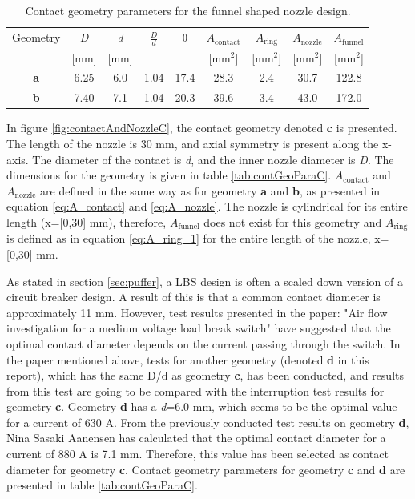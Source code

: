 \documentclass[10pt,b5paper,twoside]{article}
\begin{document}
\begin{table}[H]
\center
\caption{Contact geometry parameters for the funnel shaped nozzle design.}
 \begin{tabular}{|c|c|c|c|c|c|c|c|c|}
\hline 
Geometry & \textit{D} & \textit{d}  & $\frac{D}{d}$ & $\mathrm{\theta}$ & $A_\mathrm{{contact}}$ & $A_\mathrm{{ring}}$  & $A_\mathrm{{nozzle}}$ & $A_\mathrm{{funnel}}$ \\
  & [mm] &  [mm] &   &   &   [mm$^2$] &  [mm$^2$] &   [mm$^2$] &   [mm$^2$]\\
\hline 
\textbf{a} & 6.25 & 6.0 & 1.04 & 17.4 & 28.3 & 2.4 & 30.7 & 122.8\\ 
\hline 
\textbf{b} & 7.40 & 7.1 & 1.04 & 20.3 & 39.6 & 3.4 & 43.0 & 172.0\\ 
\hline 
\end{tabular} 
\label{tab:contGeoPara}
\end{table}

In figure \ref{fig:contactAndNozzleC}, the contact geometry denoted \textbf{c} is presented. The length of the nozzle is 30 mm, and axial symmetry is present along the x-axis. The diameter of the contact is \textit{d}, and the inner nozzle diameter is \textit{D}. The dimensions for the geometry is given in table \ref{tab:contGeoParaC}. $A_\mathrm{{contact}}$ and $A_\mathrm{{nozzle}}$ are defined in the same way as for geometry \textbf{a} and \textbf{b}, as presented in equation \eqref{eq:A_contact} and \eqref{eq:A_nozzle}. The nozzle is cylindrical for its entire length (x=[0,30] mm), therefore, $A_\mathrm{{funnel}}$ does not exist for this geometry and $A_\mathrm{{ring}}$ is defined as in equation \eqref{eq:A_ring_1} for the entire length of the nozzle, x=[0,30] mm. 

As stated in section \ref{sec:puffer}, a LBS design is often a scaled down version of a circuit breaker design. A result of this is that a common contact diameter is approximately 11 mm. However, test results presented in the paper: "Air flow investigation for a medium voltage load break switch" \cite{bib:AFIMVLBA} have suggested that the optimal contact diameter depends on the current passing through the switch. In the paper mentioned above, tests for another geometry (denoted \textbf{d} in this report), which has the same D/d as geometry \textbf{c}, has been conducted, and results from this test are going to be compared with the interruption test results for geometry \textbf{c}. Geometry \textbf{d} has a \textit{d}=6.0 mm, which seems to be the optimal value for a current of 630 A. From the previously conducted test results on geometry \textbf{d}, Nina Sasaki Aanensen has calculated that the optimal contact diameter for a current of 880 A is 7.1 mm. Therefore, this value has been selected as contact diameter for geometry \textbf{c}. Contact geometry parameters for geometry \textbf{c} and \textbf{d} are presented in table \ref{tab:contGeoParaC}.
\end{document}
